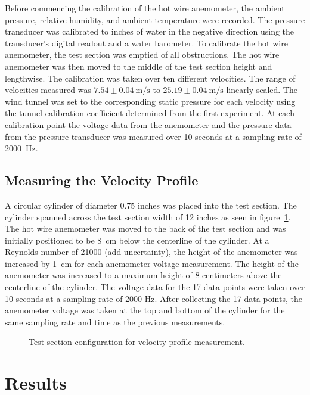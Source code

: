 \documentclass[journal,letterpaper]{IEEEtran}
\begin{document}
Before commencing the calibration of the hot wire anemometer, the ambient pressure, relative humidity, and ambient temperature were recorded.
The pressure transducer was calibrated to inches of water in the negative direction using the transducer's digital readout and a water barometer. 
To calibrate the hot wire anemometer, the test section was emptied of all obstructions.
The hot wire anemometer was then moved to the middle of the test section height and lengthwise.
The calibration was taken over ten different velocities.
The range of velocities measured was $7.54 \pm \qty{0.04}{\m\per\s}$ to $25.19 \pm \qty{0.04}{\m\per\s}$ linearly scaled.
The wind tunnel was set to the corresponding static pressure for each velocity using the tunnel calibration coefficient determined from the first experiment.
At each calibration point the voltage data from the anemometer and the pressure data from the pressure transducer was measured over 10 seconds at a sampling rate of \qty{2000}{\hertz}.

\subsection{Measuring the Velocity Profile}

A circular cylinder of diameter 0.75 inches was placed into the test section.
The cylinder spanned across the test section width of 12 inches as seen in figure~\ref{fig:cylinder}.
The hot wire anemometer was moved to the back of the test section and was initially positioned to be \qty{8}{\cm} below the centerline of the cylinder.
At a Reynolds number of 21000 (add uncertainty), the height of the anemometer was increased by \qty{1}{\cm} for each anemometer voltage measurement.
The height of the anemometer was increased to a maximum height of 8 centimeters above the centerline of the cylinder.
The voltage data for the 17 data points were taken over 10 seconds at a sampling rate of 2000 Hz.
After collecting the 17 data points, the anemometer voltage was taken at the top and bottom of the cylinder for the same sampling rate and time as the previous measurements.

\begin{figure}[H]
    \centering
    \caption{Test section configuration for velocity profile measurement.}
    \label{fig:cylinder}
\end{figure}


\section{Results}
\end{document}
